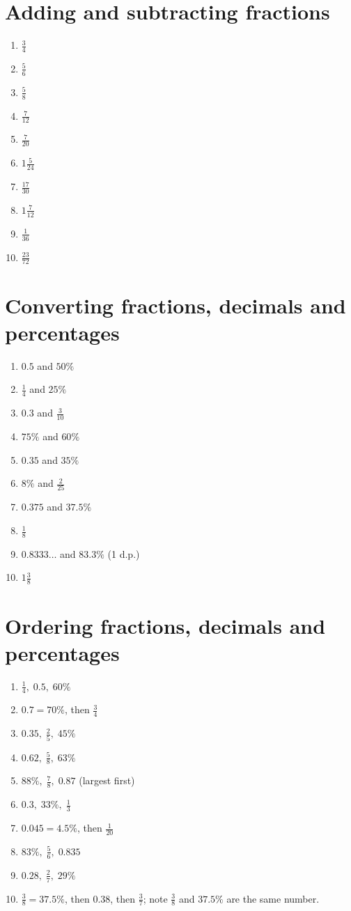 \documentclass{article}
\begin{document}
\section*{Adding and subtracting fractions}
\begin{enumerate}
    \item $\frac34$
    \item $\frac56$
    \item $\frac58$
    \item $\frac{7}{12}$
    \item $\frac{7}{20}$
    \item $1\frac{5}{24}$
    \item $\frac{17}{30}$
    \item $1\frac{7}{12}$
    \item $\frac{1}{36}$
    \item $\frac{23}{72}$
\end{enumerate}

\section*{Converting fractions, decimals and percentages}
\begin{enumerate}
    \item $0.5$ and $50\%$
    \item $\frac14$ and $25\%$
    \item $0.3$ and $\frac{3}{10}$
    \item $75\%$ and $60\%$
    \item $0.35$ and $35\%$
    \item $8\%$ and $\frac{2}{25}$
    \item $0.375$ and $37.5\%$
    \item $\frac18$
    \item $0.8333\ldots$ and $83.3\%$ (1 d.p.)
    \item $1\frac38$
\end{enumerate}

\section*{Ordering fractions, decimals and percentages}
\begin{enumerate}
    \item $\frac14,\;0.5,\;60\%$
    \item $0.7=70\%$, then $\frac34$
    \item $0.35,\;\frac25,\;45\%$
    \item $0.62,\;\frac58,\;63\%$
    \item $88\%,\;\frac78,\;0.87$ \quad (largest first)
    \item $0.3,\;33\%,\;\frac13$
    \item $0.045=4.5\%$, then $\frac{1}{20}$
    \item $83\%,\;\frac56,\;0.835$
    \item $0.28,\;\frac27,\;29\%$
    \item $\frac38=37.5\%$, then $0.38$, then $\frac37$; note $\frac38$ and $37.5\%$ are the same number.
\end{enumerate}
\end{document}

